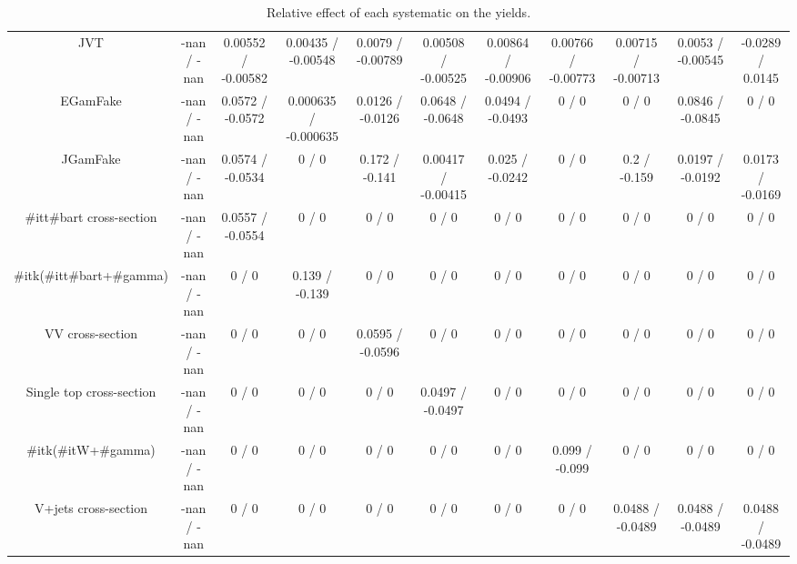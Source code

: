 \begin{table}[htbp]
\begin{center}
\begin{tabular}{|c|c|c|c|c|c|c|c|c|c|c|}
  JVT & -nan / -nan & 0.00552 / -0.00582 & 0.00435 / -0.00548 & 0.0079 / -0.00789 & 0.00508 / -0.00525 & 0.00864 / -0.00906 & 0.00766 / -0.00773 & 0.00715 / -0.00713 & 0.0053 / -0.00545 & -0.0289 / 0.0145 \\ 
  EGamFake & -nan / -nan & 0.0572 / -0.0572 & 0.000635 / -0.000635 & 0.0126 / -0.0126 & 0.0648 / -0.0648 & 0.0494 / -0.0493 & 0 / 0 & 0 / 0 & 0.0846 / -0.0845 & 0 / 0 \\ 
  JGamFake & -nan / -nan & 0.0574 / -0.0534 & 0 / 0 & 0.172 / -0.141 & 0.00417 / -0.00415 & 0.025 / -0.0242 & 0 / 0 & 0.2 / -0.159 & 0.0197 / -0.0192 & 0.0173 / -0.0169 \\ 
  #it{t#bar{t}} cross-section & -nan / -nan & 0.0557 / -0.0554 & 0 / 0 & 0 / 0 & 0 / 0 & 0 / 0 & 0 / 0 & 0 / 0 & 0 / 0 & 0 / 0 \\ 
  #it{k}(#it{t#bar{t}+#gamma}) & -nan / -nan & 0 / 0 & 0.139 / -0.139 & 0 / 0 & 0 / 0 & 0 / 0 & 0 / 0 & 0 / 0 & 0 / 0 & 0 / 0 \\ 
  VV cross-section & -nan / -nan & 0 / 0 & 0 / 0 & 0.0595 / -0.0596 & 0 / 0 & 0 / 0 & 0 / 0 & 0 / 0 & 0 / 0 & 0 / 0 \\ 
  Single top cross-section & -nan / -nan & 0 / 0 & 0 / 0 & 0 / 0 & 0.0497 / -0.0497 & 0 / 0 & 0 / 0 & 0 / 0 & 0 / 0 & 0 / 0 \\ 
  #it{k}(#it{W+#gamma}) & -nan / -nan & 0 / 0 & 0 / 0 & 0 / 0 & 0 / 0 & 0 / 0 & 0.099 / -0.099 & 0 / 0 & 0 / 0 & 0 / 0 \\ 
  V+jets cross-section & -nan / -nan & 0 / 0 & 0 / 0 & 0 / 0 & 0 / 0 & 0 / 0 & 0 / 0 & 0.0488 / -0.0489 & 0.0488 / -0.0489 & 0.0488 / -0.0489 \\ 
\hline 
\end{tabular} 
\caption{Relative effect of each systematic on the yields.} 
\end{center} 
\end{table} 
